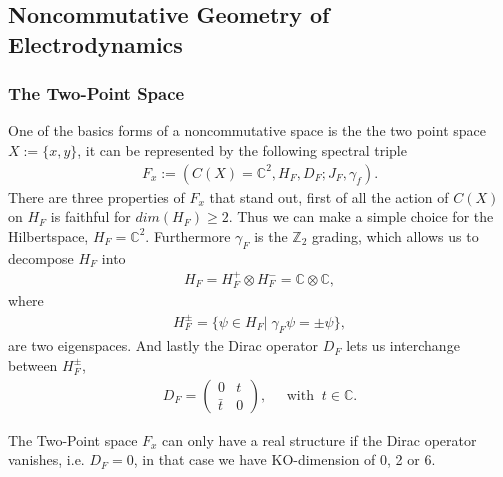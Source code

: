 \subsection{Noncommutative Geometry of Electrodynamics}
\subsubsection{The Two-Point Space}
One of the basics forms of a noncommutative space is the the two point space $X
:= \{x, y\}$, it can be represented by the following spectral triple
\begin{align}
    F_x := (C(X) = \mathbb{C}^2, H_F, D_F; J_F, \gamma _f).
\end{align}
There are three properties of $F_x$ that stand out, first of all the action of
$C(X)$ on $H_F$ is faithful for $dim(H_F) \geq 2$. Thus we can make a simple
choice for the Hilbertspace, $H_F = \mathbb{C}^2$. Furthermore $\gamma_F$ is
the $\mathbb{Z}_2$ grading, which allows us to decompose $H_F$ into
\begin{align}
   H_F = H_F^+ \otimes H_F^- = \mathbb{C} \otimes \mathbb{C},
\end{align}
where
\begin{align}
    H_F^\pm = \{\psi \in H_F |\; \gamma_F\psi = \pm \psi\},
\end{align}
are two eigenspaces. And lastly the Dirac operator $D_F$ lets us
interchange between $H_F^\pm$,
\begin{align}
    D_F =
        \begin{pmatrix}0 & t \\ \bar{t} & 0\end{pmatrix},  \;\;\;\;\;
            \text{with} \;\; t\in\mathbb{C}.
\end{align}

    The Two-Point space $F_x$ can only have a real structure if the Dirac
    operator vanishes, i.e. $D_F = 0$, in that case we have KO-dimension of 0,
    2 or 6.

